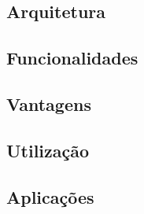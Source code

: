 \documentclass[12pt]{article}
\begin{document}

\subsection{Arquitetura}


\subsection{Funcionalidades}






\subsection{Vantagens}


\subsection{Utilização}




\subsection{Aplicações}
\end{document}
